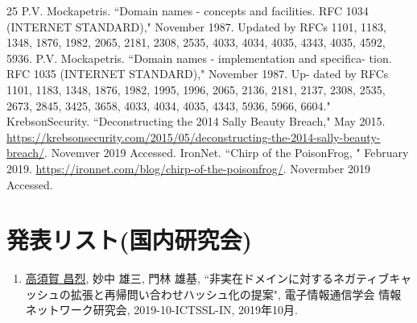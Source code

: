 \documentclass[12pt]{jarticle} %
\begin{document}
\newpage
%
\begin{thebibliography} {25}\small
  P.V. Mockapetris. ``Domain names - concepts and facilities. RFC 1034 (INTERNET STANDARD)," November 1987. Updated by RFCs 1101, 1183, 1348, 1876, 1982, 2065, 2181, 2308, 2535, 4033, 4034, 4035, 4343, 4035, 4592, 5936.
  P.V. Mockapetris. ``Domain names - implementation and specifica- tion. RFC 1035 (INTERNET STANDARD)," November 1987. Up- dated by RFCs 1101, 1183, 1348, 1876, 1982, 1995, 1996, 2065, 2136, 2181, 2137, 2308, 2535, 2673, 2845, 3425, 3658, 4033, 4034, 4035, 4343, 5936, 5966, 6604."
  KrebsonSecurity. ``Deconstructing the 2014 Sally Beauty Breach," May 2015. \url{https://krebsonsecurity.com/2015/05/deconstructing-the-2014-sally-beauty-breach/}. Novemver 2019 Accessed.
  IronNet. ``Chirp of the PoisonFrog, " February 2019. \url{https://ironnet.com/blog/chirp-of-the-poisonfrog/}. Novermber 2019 Accessed.
 \bibitem{}
\end{thebibliography}





\appendix

\section{発表リスト(国内研究会)}
\begin{enumerate}
 \item \underline{高須賀 昌烈}, 妙中 雄三, 門林 雄基, ``非実在ドメインに対するネガティブキャッシュの拡張と再帰問い合わせハッシュ化の提案", 電子情報通信学会 情報ネットワーク研究会, 2019-10-ICTSSL-IN, 2019年10月.
\end{enumerate}
\end{document}
